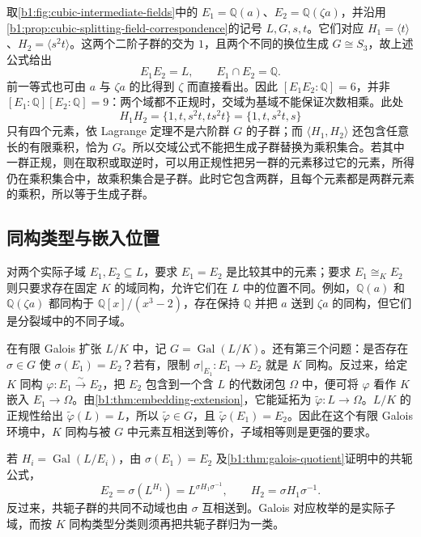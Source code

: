 \ProseParagraphBreak
取\cref{b1:fig:cubic-intermediate-fields}中的 \(E_1=\mathbb Q(a)\)、\(E_2=\mathbb Q(\zeta a)\)，并沿用\cref{b1:prop:cubic-splitting-field-correspondence}的记号 \(L,G,s,t\)。它们对应 \(H_1=\langle t\rangle\)、\(H_2=\langle s^2t\rangle\)。这两个二阶子群的交为 \(1\)，且两个不同的换位生成 \(G\cong S_3\)，故上述公式给出
\[
	E_1E_2=L,\qquad E_1\cap E_2=\mathbb Q.
\]
前一等式也可由 \(a\) 与 \(\zeta a\) 的比得到 \(\zeta\) 而直接看出。因此 \([E_1E_2:\mathbb Q]=6\)，并非 \([E_1:\mathbb Q][E_2:\mathbb Q]=9\)：两个域都不正规时，交域为基域不能保证次数相乘。此处
\[
	H_1H_2=\{1,t,s^2t,ts^2t\}=\{1,t,s^2t,s\}
\]
只有四个元素，依 Lagrange 定理不是六阶群 \(G\) 的子群；而 \(\langle H_1,H_2\rangle\) 还包含任意长的有限乘积，恰为 \(G\)。所以交域公式不能把生成子群替换为乘积集合。若其中一群正规，则在取积或取逆时，可以用正规性把另一群的元素移过它的元素，所得仍在乘积集合中，故乘积集合是子群。此时它包含两群，且每个元素都是两群元素的乘积，所以等于生成子群。

\subsection{同构类型与嵌入位置}
\label{b1:subsec:1904:03}

对两个实际子域 \(E_1,E_2\subseteq L\)，要求 \(E_1=E_2\) 是比较其中的元素；要求 \(E_1\cong_K E_2\) 则只要求存在固定 \(K\) 的域同构，允许它们在 \(L\) 中的位置不同。例如，\(\mathbb Q(a)\) 和 \(\mathbb Q(\zeta a)\) 都同构于 \(\mathbb Q[x]/(x^3-2)\)，存在保持 \(\mathbb Q\) 并把 \(a\) 送到 \(\zeta a\) 的同构，但它们是分裂域中的不同子域。

\ProseParagraphBreak
在有限 Galois 扩张 \(L/K\) 中，记 \(G=\operatorname{Gal}(L/K)\)。还有第三个问题：是否存在 \(\sigma\in G\) 使 \(\sigma(E_1)=E_2\)？若有，限制 \(\sigma|_{E_1}:E_1\rightarrow E_2\) 就是 \(K\) 同构。反过来，给定 \(K\) 同构 \(\varphi:E_1\overset{\sim}{\longrightarrow}E_2\)，把 \(E_2\) 包含到一个含 \(L\) 的代数闭包 \(\Omega\) 中，便可将 \(\varphi\) 看作 \(K\) 嵌入 \(E_1\rightarrow\Omega\)。由\cref{b1:thm:embedding-extension}，它能延拓为 \(\widetilde\varphi:L\rightarrow\Omega\)。\(L/K\) 的正规性给出 \(\widetilde\varphi(L)=L\)，所以 \(\widetilde\varphi\in G\)，且 \(\widetilde\varphi(E_1)=E_2\)。因此在这个有限 Galois 环境中，\(K\) 同构与被 \(G\) 中元素互相送到等价，子域相等则是更强的要求。

\ProseParagraphBreak
若 \(H_i=\operatorname{Gal}(L/E_i)\)，由 \(\sigma(E_1)=E_2\) 及\cref{b1:thm:galois-quotient}证明中的共轭公式，
\[
	E_2=\sigma(L^{H_1})=L^{\sigma H_1\sigma^{-1}},\qquad H_2=\sigma H_1\sigma^{-1}.
\]
反过来，共轭子群的共同不动域也由 \(\sigma\) 互相送到。Galois 对应枚举的是实际子域，而按 \(K\) 同构类型分类则须再把共轭子群归为一类。

